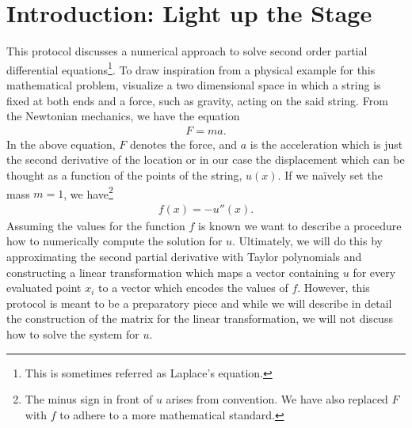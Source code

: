 \section{Introduction: Light up the Stage}

This protocol discusses a numerical approach to solve second order partial differential equations\footnote{This is sometimes referred as Laplace's equation.}. To draw inspiration from a physical example for this mathematical problem, visualize a two dimensional space in which a string is fixed at both ends and a force, such as gravity, acting on the said string. From the Newtonian mechanics, we have the equation
\begin{align*}
	F = ma \text{.}
\end{align*}
In the above equation, \(F\) denotes the force, and \(a\) is the acceleration which is just the second derivative of the location or in our case the displacement which can be thought as a function of the points of the string, \(u(x)\). If we na{\"i}vely set the mass \(m = 1\), we have\footnote{The minus sign in front of \(u\) arises from convention. We have also replaced \(F\) with \(f\) to adhere to a more mathematical standard.}
\begin{align*}
	f(x) = - u''(x) \text{.}
\end{align*}
Assuming the values for the function \(f\) is known we want to describe a procedure how to numerically compute the solution for \(u\). Ultimately, we will do this by approximating the second partial derivative with Taylor polynomials and constructing a linear transformation which maps a vector containing \(u\) for every evaluated point \(x_i\) to a vector which encodes the values of \(f\).
However, this protocol is meant to be a preparatory piece and while we will describe in detail the construction of the matrix for the linear transformation, we will not discuss how to solve the system for \(u\).